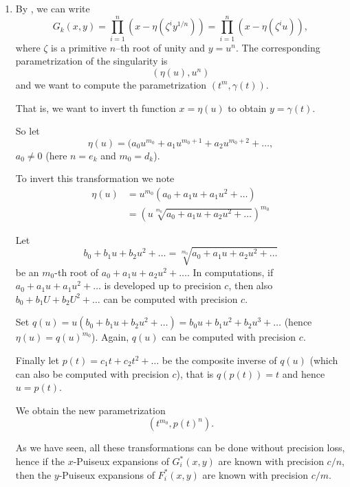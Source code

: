 \documentclass[a4paper,11pt,reqno]{amsart}%
\theoremstyle{definition}
\theoremstyle{plain}
\theoremstyle{remark}
\begin{document}
\begin{enumerate}
Modulo $X^{N_0-\kappa}$, we obtain from (\ref{FXfactors}):
$$
G_k^*(\alpha(X,Y), \beta(X,Y)) \equiv F_i(X,Y) \mod X^{N_0-\kappa}.
$$

We have to show that if we apply this same reparametrization to $G_k$ we will obtain
$$G_k(\alpha(X,Y), \beta(X,Y)) \equiv H_k \equiv F_k \mod X^{N_0 - \kappa}.$$

\item By \cite[Theorem 5.17]{JP}, we can write
$$
G_k(x,y) = \prod_{i=1}^n (x - \eta(\zeta^i y^{1/n})) = \prod_{i=1}^n (x - \eta(\zeta^i u)),
$$
where $\zeta$ is a primitive $n$–th root of unity and $y = u^n$. The corresponding parametrization of the singularity is
$$
(\eta(u), u^n)
$$
and we want to compute the parametrization $(t^m, \gamma(t))$.

That is, we want to invert th function $x = \eta(u)$ to obtain $y = \gamma(t)$.

So let
$$\eta(u) = (a_0 u^{m_0} + a_1 u^{m_0+1} + a_2 u^{m_0+2} + \dots,$$
$a_0 \neq 0$ (here $n = e_k$ and $m_0 = d_k$).

To invert this transformation we note
\begin{align*}
\eta(u) &= u^{m_0} (a_0 + a_1 u + a_1 u^2 + \dots) \\
        &= \left(u \sqrt[m_0]{a_0 + a_1 u + a_2 u^2 + \dots}\right)^{m_0}
\end{align*}

Let
$$
b_0 + b_1 u + b_2 u^2 + \dots = \sqrt[m_0]{a_0 + a_1 u + a_2 u^2 + \dots}
$$
be an $m_0$-th root of $a_0 + a_1 u + a_2 u^2 + \dots$. In computations, if $a_0 + a_1 u + a_1 u^2 + \dots$ is developed up to precision $c$, then also $b_0 + b_1 U + b_2 U^2 + \dots$ can be computed with precision $c$.

Set $q(u) = u (b_0  + b_1 u + b_2 u^2 + \dots) = b_0 u + b_1 u^2 + b_2 u^3 + \dots$ (hence $\eta(u) = q(u)^{m_0}$). Again, $q(u)$ can be computed with precision $c$.

Finally let $p(t) = c_1 t + c_2 t^2 + \dots$ be the composite inverse of $q(u)$ (which can also be computed with precision $c$), that is $q(p(t)) = t$ and hence $u = p(t)$.

We obtain the new parametrization
$$(t^{m_0}, p(t)^n).$$

As we have seen, all these transformations can be done without precision loss, hence if the $x$-Puiseux expansions of $G^*_i(x,y)$ are known with precision $c/n$, then the $y$-Puiseux expansions of $F^*_i(x,y)$ are known with precision $c/m$.
%

\end{enumerate}
\end{document}
